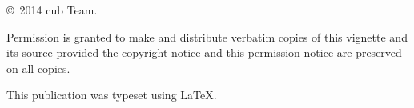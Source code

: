 \null
\vfill
\copyright\ 2014 cub Team.

Permission is granted to make and distribute verbatim copies of
this vignette and its source provided the copyright notice and
this permission notice are preserved on all copies.

This publication was typeset using \LaTeX.
